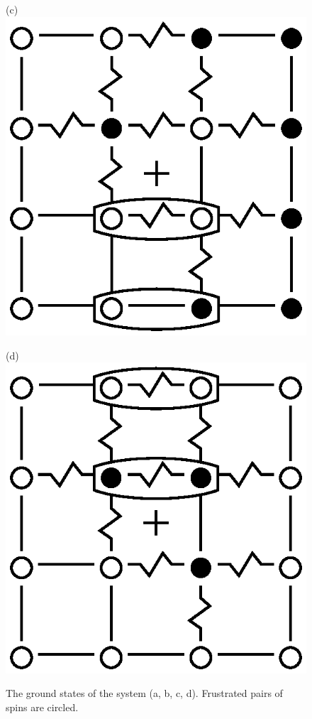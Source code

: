 \documentclass[utf8, babel, sor, jor, amsmath, amssymb, reprint]{elsarticle} %
\begin{document}
\begin{figure}[H]
\begin{minipage}[h]{0.2\linewidth}
	\end{minipage}
	\hfill
	\begin{minipage}[h]{0.2\linewidth}
		\centering(c)
		\includegraphics[width=1\linewidth]{pictures/Cl1_Type2_gs3.eps}
	\end{minipage}
	\hfill
	\begin{minipage}[h]{0.2\linewidth}
		\centering(d)
		\includegraphics[width=1\linewidth]{pictures/Cl1_Type2_gs4.eps}
	\end{minipage}
	\caption{The ground states of the system (a, b, c, d). Frustrated pairs of spins are circled.}
	\label{fig:4x4.1}
	
\end{figure}
\end{document}

